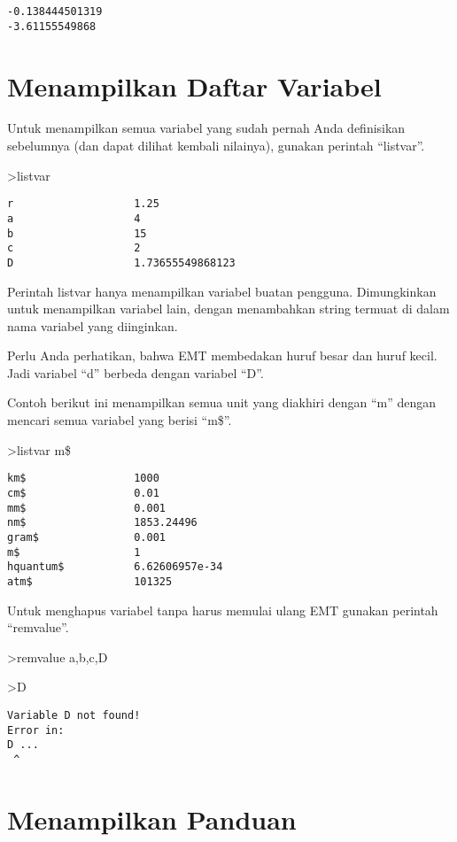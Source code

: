 \documentclass[
]{book}
\begin{document}
\begin{verbatim}
-0.138444501319
-3.61155549868
\end{verbatim}

\chapter{Menampilkan Daftar Variabel}\label{menampilkan-daftar-variabel}

Untuk menampilkan semua variabel yang sudah pernah Anda definisikan sebelumnya (dan dapat dilihat kembali nilainya), gunakan perintah ``listvar''.

\textgreater listvar

\begin{verbatim}
r                   1.25
a                   4
b                   15
c                   2
D                   1.73655549868123
\end{verbatim}

Perintah listvar hanya menampilkan variabel buatan pengguna. Dimungkinkan untuk menampilkan variabel lain, dengan menambahkan string termuat di dalam nama variabel yang diinginkan.

Perlu Anda perhatikan, bahwa EMT membedakan huruf besar dan huruf kecil. Jadi variabel ``d'' berbeda dengan variabel ``D''.

Contoh berikut ini menampilkan semua unit yang diakhiri dengan ``m'' dengan mencari semua variabel yang berisi ``m\$''.

\textgreater listvar m\$

\begin{verbatim}
km$                 1000
cm$                 0.01
mm$                 0.001
nm$                 1853.24496
gram$               0.001
m$                  1
hquantum$           6.62606957e-34
atm$                101325
\end{verbatim}

Untuk menghapus variabel tanpa harus memulai ulang EMT gunakan perintah ``remvalue''.

\textgreater remvalue a,b,c,D

\textgreater D

\begin{verbatim}
Variable D not found!
Error in:
D ...
 ^
\end{verbatim}

\chapter{Menampilkan Panduan}\label{menampilkan-panduan}
\end{document}
